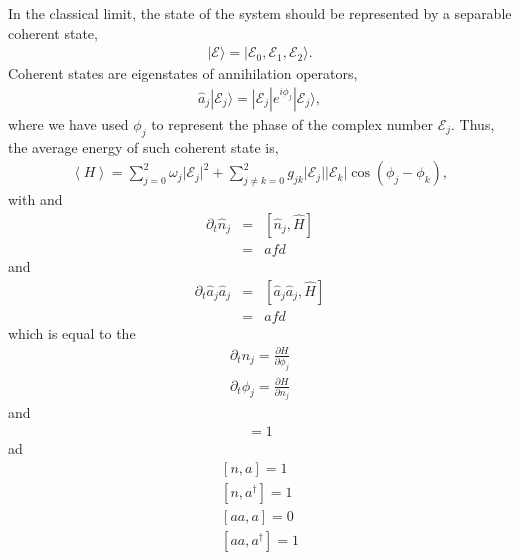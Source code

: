 \documentclass[9pt,twocolumn,twoside]{osajnl}
\begin{document}
In the classical limit, the state of the system should be represented by a separable coherent state,
\begin{eqnarray}
\vert \mathcal{E} \rangle = \vert \mathcal{E}_{0}, \mathcal{E}_{1}, \mathcal{E}_{2}  \rangle.
\end{eqnarray} 
Coherent states are eigenstates of annihilation operators,  
\begin{eqnarray}
	\hat{a}_j | \mathcal{E}_{j} \rangle= |\mathcal{E}_j| e^{i \phi_{j}} | \mathcal{E}_{j}\rangle ,
\end{eqnarray}
where  we have used $\phi_{j}$ to represent the phase of the complex number $\mathcal{E}_{j}$.
Thus, the average energy of such coherent state is,
\begin{eqnarray}
	\left\langle H \right\rangle = \sum_{j=0}^{2} \omega_{j} \vert \mathcal{E}_{j} \vert^2 
	+ \sum_{j \neq k = 0}^{2} g_{jk} \vert \mathcal{E}_{j} \vert  \vert \mathcal{E}_{k} \vert \cos \left( \phi_{j} - \phi_{k} \right),
\end{eqnarray}
with
and 
\begin{eqnarray}
 \partial_t \hat{n}_j &=& [\hat{n}_j,\hat{H}]\\
 &=& afd
\end{eqnarray}
and
\begin{eqnarray}
\partial_t \hat{a}_j \hat{a}_j &=& [\hat{a}_j \hat{a}_j,\hat{H}]\\
&=& afd
\end{eqnarray}
which is equal to the 
\begin{eqnarray}
\partial_t n_j = \frac{\partial H}{\partial \phi_j}\\
\partial_t \phi_j = \frac{\partial H}{\partial n_j}  
\end{eqnarray}
and
\begin{eqnarray}
	[a^{\dagger}, a] = 1	
\end{eqnarray}
ad
\begin{eqnarray}
	{}[n, a] = 1 \\
	{}[n, a^{\dagger}] = 1 \\
	{}[aa, a] = 0 \\
	{}[aa, a^{\dagger}] = 1 
\end{eqnarray}
\end{document}

